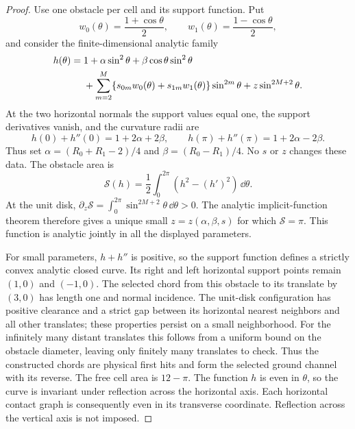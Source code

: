 \begin{proof}
Use one obstacle per cell and its support function. Put
\[
 w_0(\theta)=\frac{1+\cos\theta}{2},\qquad
 w_1(\theta)=\frac{1-\cos\theta}{2},
\]
and consider the finite-dimensional analytic family
\begin{align}
 h(\theta)={}&1+\alpha\sin^2\theta+
                 \beta\cos\theta\sin^2\theta\notag\\
 &+\sum_{m=2}^M
       \{s_{0m}w_0(\theta)+s_{1m}w_1(\theta)\}\sin^{2m}\theta
           +z\sin^{2M+2}\theta.\label{eq:v12-support}
\end{align}
At the two horizontal normals the support values equal one, the
support derivatives vanish, and the curvature radii are
\[
 h(0)+h''(0)=1+2\alpha+2\beta,
 \qquad h(\pi)+h''(\pi)=1+2\alpha-2\beta.
\]
Thus set $\alpha=(R_0+R_1-2)/4$ and
$\beta=(R_0-R_1)/4$. No $s$ or $z$ changes these data.
The obstacle area is
\[
                 \mathcal S(h)=\frac12\int_0^{2\pi}
                                      (h^2-(h')^2)\,\dd\theta.
\]
At the unit disk,
$\partial_z\mathcal S=\int_0^{2\pi}\sin^{2M+2}\theta\,\dd\theta>0$.
The analytic implicit-function theorem therefore gives a unique small
$z=z(\alpha,\beta,s)$ for which $\mathcal S=\pi$. This function is
analytic jointly in all the displayed parameters.

For small parameters, $h+h''$ is positive, so the support function
defines a strictly convex analytic closed curve. Its right and left
horizontal support points remain $(1,0)$ and $(-1,0)$.
The selected chord from this obstacle to its translate by $(3,0)$
has length one and normal incidence. The unit-disk configuration has
positive clearance and a strict gap between its horizontal nearest
neighbors and all other translates; these properties persist on a
small neighborhood. For the infinitely many distant translates this
follows from a uniform bound on the obstacle diameter, leaving only
finitely many translates to check. Thus the constructed chords are
physical first hits and form the selected ground channel with its
reverse. The free cell area is $12-\pi$.
The function $h$ is even in $\theta$, so the curve is invariant under
reflection across the horizontal axis. Each horizontal contact graph
is consequently even in its transverse coordinate. Reflection across
the vertical axis is not imposed.


\end{proof}
